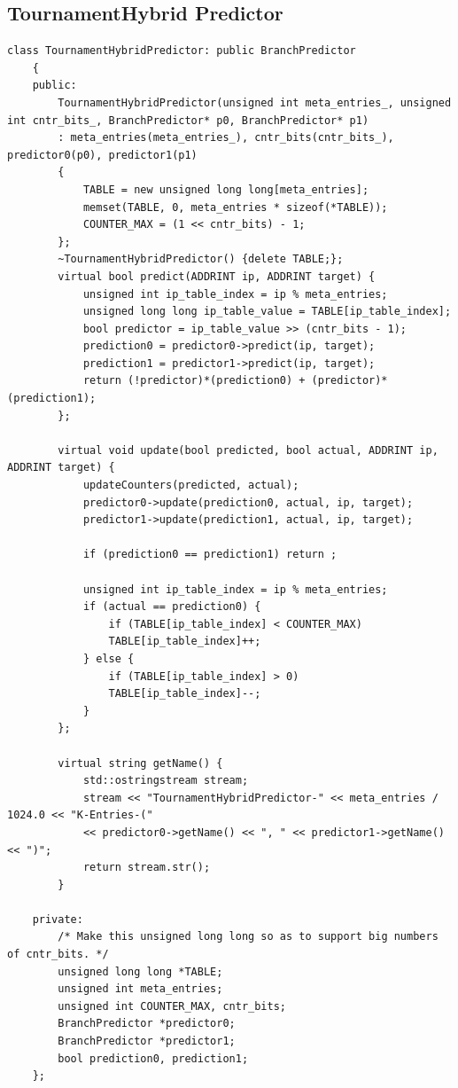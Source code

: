 \documentclass{article}
\newcommand{\eng}[1]{\foreignlanguage{english}{#1}}
\begin{document}
\subsection{\eng{TournamentHybrid Predictor}}
\begin{lstlisting}[style=Cstyle]
    class TournamentHybridPredictor: public BranchPredictor
    {
    public:
        TournamentHybridPredictor(unsigned int meta_entries_, unsigned int cntr_bits_, BranchPredictor* p0, BranchPredictor* p1)
        : meta_entries(meta_entries_), cntr_bits(cntr_bits_), predictor0(p0), predictor1(p1)
        {
            TABLE = new unsigned long long[meta_entries];
            memset(TABLE, 0, meta_entries * sizeof(*TABLE));
            COUNTER_MAX = (1 << cntr_bits) - 1;
        };
        ~TournamentHybridPredictor() {delete TABLE;};
        virtual bool predict(ADDRINT ip, ADDRINT target) {
            unsigned int ip_table_index = ip % meta_entries;
            unsigned long long ip_table_value = TABLE[ip_table_index];
            bool predictor = ip_table_value >> (cntr_bits - 1);
            prediction0 = predictor0->predict(ip, target);
            prediction1 = predictor1->predict(ip, target);
            return (!predictor)*(prediction0) + (predictor)*(prediction1);
        };

        virtual void update(bool predicted, bool actual, ADDRINT ip, ADDRINT target) {
            updateCounters(predicted, actual);
            predictor0->update(prediction0, actual, ip, target);
            predictor1->update(prediction1, actual, ip, target);

            if (prediction0 == prediction1) return ;

            unsigned int ip_table_index = ip % meta_entries;
            if (actual == prediction0) {
                if (TABLE[ip_table_index] < COUNTER_MAX)
                TABLE[ip_table_index]++;
            } else {
                if (TABLE[ip_table_index] > 0)
                TABLE[ip_table_index]--;
            }
        };

        virtual string getName() {
            std::ostringstream stream;
            stream << "TournamentHybridPredictor-" << meta_entries / 1024.0 << "K-Entries-("
            << predictor0->getName() << ", " << predictor1->getName() << ")";
            return stream.str();
        }

    private:
        /* Make this unsigned long long so as to support big numbers of cntr_bits. */
        unsigned long long *TABLE;
        unsigned int meta_entries;
        unsigned int COUNTER_MAX, cntr_bits;
        BranchPredictor *predictor0;
        BranchPredictor *predictor1;
        bool prediction0, prediction1;
    };
\end{lstlisting}


\end{document}
